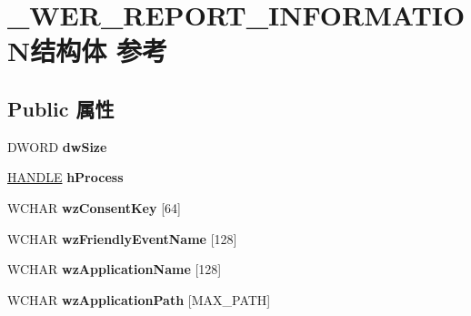 \hypertarget{struct___w_e_r___r_e_p_o_r_t___i_n_f_o_r_m_a_t_i_o_n}{}\section{\+\_\+\+W\+E\+R\+\_\+\+R\+E\+P\+O\+R\+T\+\_\+\+I\+N\+F\+O\+R\+M\+A\+T\+I\+O\+N结构体 参考}
\label{struct___w_e_r___r_e_p_o_r_t___i_n_f_o_r_m_a_t_i_o_n}
\subsection*{Public 属性}
\begin{DoxyCompactItemize}
\item 
\mbox{\label{struct___w_e_r___r_e_p_o_r_t___i_n_f_o_r_m_a_t_i_o_n_a6656e2349f8104f30830a31888444171}} 
D\+W\+O\+RD {\bfseries dw\+Size}
\item 
\mbox{\label{struct___w_e_r___r_e_p_o_r_t___i_n_f_o_r_m_a_t_i_o_n_ada7141fa0e7f334d85c3de201084354b}} 
\hyperlink{interfacevoid}{H\+A\+N\+D\+LE} {\bfseries h\+Process}
\item 
\mbox{\label{struct___w_e_r___r_e_p_o_r_t___i_n_f_o_r_m_a_t_i_o_n_ad7f4d163352f240a506d63dc616bcf33}} 
W\+C\+H\+AR {\bfseries wz\+Consent\+Key} \mbox{[}64\mbox{]}
\item 
\mbox{\label{struct___w_e_r___r_e_p_o_r_t___i_n_f_o_r_m_a_t_i_o_n_ab0007ba40f11bf7c6c38761aa1ec0330}} 
W\+C\+H\+AR {\bfseries wz\+Friendly\+Event\+Name} \mbox{[}128\mbox{]}
\item 
\mbox{\label{struct___w_e_r___r_e_p_o_r_t___i_n_f_o_r_m_a_t_i_o_n_a77c49d0356e3eb7cb2573a47430fd5c0}} 
W\+C\+H\+AR {\bfseries wz\+Application\+Name} \mbox{[}128\mbox{]}
\item 
\mbox{\label{struct___w_e_r___r_e_p_o_r_t___i_n_f_o_r_m_a_t_i_o_n_a1a170b0448fd31394c0616a60b6e64e8}} 
W\+C\+H\+AR {\bfseries wz\+Application\+Path} \mbox{[}M\+A\+X\+\_\+\+P\+A\+TH\mbox{]}

\end{DoxyCompactItemize}
